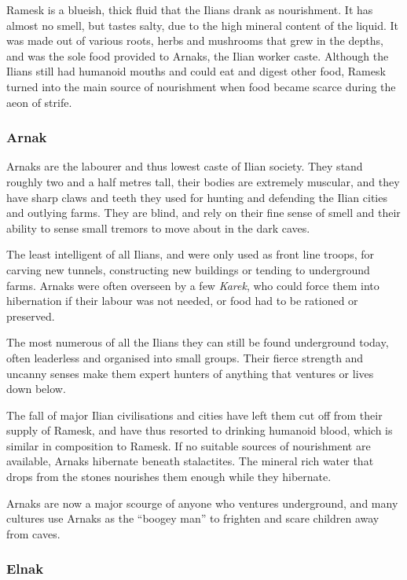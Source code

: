 Ramesk is a blueish, thick fluid that the Ilians drank as nourishment. It has
almost no smell, but tastes salty, due to the high mineral content of the
liquid. It was made out of various roots, herbs and mushrooms that grew in the
depths, and was the sole food provided to Arnaks, the Ilian worker caste.
Although the Ilians still had humanoid mouths and could eat and digest other
food, Ramesk turned into the main source of nourishment when food became scarce
during the aeon of strife.

\subsubsection{Arnak}
\label{sec:Arnak}

Arnaks are the labourer and thus lowest caste of Ilian society. They stand
roughly two and a half metres tall, their bodies are extremely muscular, and
they have sharp claws and teeth they used for hunting and defending the Ilian
cities and outlying farms. They are blind, and rely on their fine sense of
smell and their ability to sense small tremors to move about in the dark caves.

The least intelligent of all Ilians, and were only used as front line troops,
for carving new tunnels, constructing new buildings or tending to underground
farms. Arnaks were often overseen by a few \emph{Karek}, who could force them
into hibernation if their labour was not needed, or food had to be rationed or
preserved.

The most numerous of all the Ilians they can still be found underground today,
often leaderless and organised into small groups. Their fierce strength and
uncanny senses make them expert hunters of anything that ventures or lives down
below.

The fall of major Ilian civilisations and cities have left them cut off from
their supply of Ramesk, and have thus resorted to drinking humanoid blood,
which is similar in composition to Ramesk. If no suitable sources of nourishment
are available, Arnaks hibernate beneath stalactites. The mineral rich water
that drops from the stones nourishes them enough while they hibernate.

Arnaks are now a major scourge of anyone who ventures underground, and many
cultures use Arnaks as the ``boogey man'' to frighten and scare children away
from caves.

\subsubsection{Elnak}
\label{sec:Elnak}

